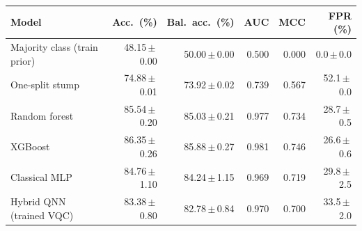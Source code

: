 \begin{tabular}{lrrrrr}
\toprule
Model & Acc.\ (\%) & Bal.\ acc.\ (\%) & AUC & MCC & FPR (\%) \\
\midrule
Majority class (train prior) & 48.15\,$\pm$\,0.00 & 50.00\,$\pm$\,0.00 & 0.500 & 0.000 & 0.0\,$\pm$\,0.0 \\
One-split stump & 74.88\,$\pm$\,0.01 & 73.92\,$\pm$\,0.02 & 0.739 & 0.567 & 52.1\,$\pm$\,0.0 \\
Random forest & 85.54\,$\pm$\,0.20 & 85.03\,$\pm$\,0.21 & 0.977 & 0.734 & 28.7\,$\pm$\,0.5 \\
XGBoost & 86.35\,$\pm$\,0.26 & 85.88\,$\pm$\,0.27 & 0.981 & 0.746 & 26.6\,$\pm$\,0.6 \\
Classical MLP & 84.76\,$\pm$\,1.10 & 84.24\,$\pm$\,1.15 & 0.969 & 0.719 & 29.8\,$\pm$\,2.5 \\
Hybrid QNN (trained VQC) & 83.38\,$\pm$\,0.80 & 82.78\,$\pm$\,0.84 & 0.970 & 0.700 & 33.5\,$\pm$\,2.0 \\
\bottomrule
\end{tabular}
